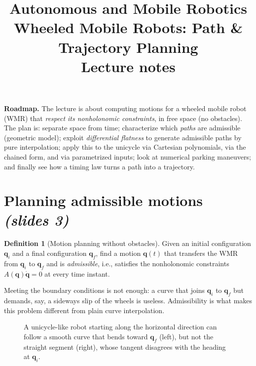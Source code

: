 \documentclass[11pt,a4paper]{article}
\title{\textbf{Autonomous and Mobile Robotics}\\[2pt]
\large Wheeled Mobile Robots: Path \& Trajectory Planning\\[2pt]
\normalsize Lecture notes}
\author{}
\date{}
\newcommand{\q}{\boldsymbol{q}}
\newcommand{\qi}{\boldsymbol{q}_i}
\newcommand{\qf}{\boldsymbol{q}_f}
\theoremstyle{definition}
\newtheorem{definition}{Definition}[section]
\theoremstyle{plain}
\theoremstyle{remark}
\begin{document}
\maketitle
\tableofcontents
\bigskip

\noindent\textbf{Roadmap.} The lecture is about computing motions for a wheeled mobile robot (WMR) that
\emph{respect its nonholonomic constraints}, in free space (no obstacles). The plan is:
separate space from time; characterize which \emph{paths} are admissible (geometric model);
exploit \emph{differential flatness} to generate admissible paths by pure interpolation; apply this to the unicycle
via Cartesian polynomials, via the chained form, and via parametrized inputs; look at numerical parking
maneuvers; and finally see how a timing law turns a path into a trajectory.

\section{Planning admissible motions \emph{(slides 3)}}

\begin{definition}[Motion planning without obstacles]
Given an initial configuration $\qi$ and a final configuration $\qf$, find a motion $\q(t)$ that transfers the WMR
from $\qi$ to $\qf$ and is \emph{admissible}, i.e., satisfies the nonholonomic constraints
$A(\q)\dot{\q}=0$ at every time instant.
\end{definition}

Meeting the boundary conditions is not enough: a curve that joins $\qi$ to $\qf$ but demands, say, a sideways
slip of the wheels is useless. Admissibility is what makes this problem different from plain curve interpolation.

\begin{figure}[h]
\centering
{}
\caption{A unicycle-like robot starting along the horizontal direction can follow a smooth curve that bends toward
$\qf$ (left), but not the straight segment (right), whose tangent disagrees with the heading at $\qi$.}
\end{figure}
\end{document}
